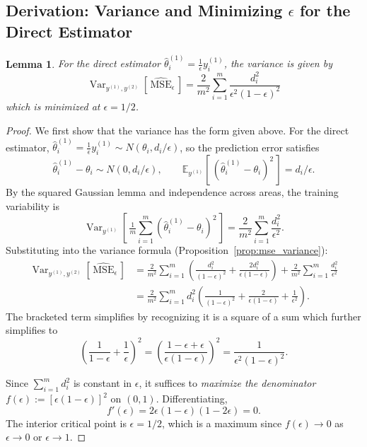 \documentclass[11pt]{article}
\newcommand{\thetatrain}{\hat{\theta}^{(1)}}           %
\newcommand{\ytrain}{y^{(1)}}                           %
\newcommand{\ytest}{y^{(2)}}                            %
\newcommand{\msehat}{\widehat{\mathrm{MSE}}_{\epsilon}}
\newcommand{\E}[2][]{\mathbb{E}_{#1}\!\left[\,#2\,\right]}
\newcommand{\Var}[2][]{\operatorname{Var}_{#1}\!\left[\,#2\,\right]}
\newcommand{\Varthin}[1]{\Var[\ytrain, \ytest]{#1}}
\theoremstyle{plain}
\newtheorem{lemma}[theorem]{Lemma}       %
\theoremstyle{definition}
\theoremstyle{remark}
\begin{document}

\subsection{Derivation: Variance and Minimizing \texorpdfstring{$\epsilon$}{epsilon} for the Direct Estimator}
\label{app:direct_var_opt}

\begin{lemma}
\label{lem:direct_var_opt}
For the direct estimator $\thetatrain_i = \tfrac{1}{\epsilon}\ytrain_i$, the variance is given by
\[
\Varthin{\msehat} = \frac{2}{m^2}\sum_{i=1}^m \frac{d_i^2}{\epsilon^2(1-\epsilon)^2}
\]
which is minimized at $\epsilon = 1/2$.
\end{lemma}

\begin{proof}
We first show that the variance has the form given above. For the direct estimator, $\thetatrain_i = \frac{1}{\epsilon}\ytrain_i \sim N(\theta_i, d_i/\epsilon)$, so the prediction error satisfies
\[
\thetatrain_i - \theta_i \sim N(0, d_i/\epsilon), \qquad \E[\ytrain]{(\thetatrain_i - \theta_i)^2} = d_i/\epsilon.
\]
By the squared Gaussian lemma and independence across areas, the training variability is
\[
\Var[\ytrain]{\tfrac{1}{m}\sum_{i=1}^m (\thetatrain_i - \theta_i)^2} = \frac{2}{m^2}\sum_{i=1}^m \frac{d_i^2}{\epsilon^2}.
\]
Substituting into the variance formula (Proposition~\ref{prop:mse_variance}):
\begin{align*}
\Varthin{\msehat} &= \frac{2}{m^2}\sum_{i=1}^m \left(\frac{d_i^2}{(1-\epsilon)^2} + \frac{2d_i^2}{\epsilon(1-\epsilon)}\right) + \frac{2}{m^2}\sum_{i=1}^m \frac{d_i^2}{\epsilon^2} \\
&= \frac{2}{m^2}\sum_{i=1}^m d_i^2 \left(\frac{1}{(1-\epsilon)^2} + \frac{2}{\epsilon(1-\epsilon)} + \frac{1}{\epsilon^2}\right).
\end{align*}
The bracketed term simplifies by recognizing it is a square of a sum which further simplifies to
\[
\left( \frac{1}{1-\epsilon} + \frac{1}{\epsilon}  \right)^2 = \left( \frac{1-\epsilon + \epsilon }{\epsilon (1-\epsilon)}\right)^2 = \frac{1}{{\epsilon^2 (1-\epsilon)^2}}.
\]

Since $\sum_{i=1}^m d_i^2$ is constant in $\epsilon$, it suffices to \textit{maximize the denominator} $f(\epsilon) := [\epsilon(1-\epsilon)]^2$ on $(0,1)$. Differentiating,
\[
f'(\epsilon) = 2\epsilon(1-\epsilon)(1 - 2\epsilon) = 0.
\]
The interior critical point is $\epsilon = 1/2$, which is a maximum since $f(\epsilon) \to 0$ as $\epsilon \to 0$ or $\epsilon \to 1$.
\end{proof}
\end{document}
